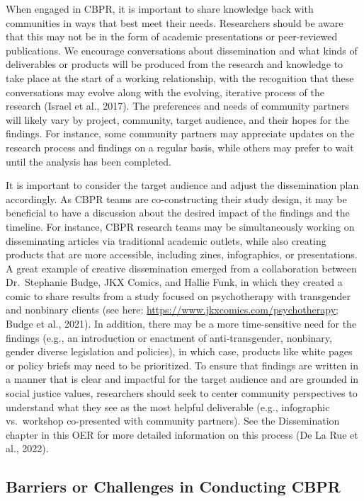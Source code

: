 \documentclass[
  11pt,
]{book}
\begin{document}
When engaged in CBPR, it is important to share knowledge back with communities in ways that best meet their needs. Researchers should be aware that this may not be in the form of academic presentations or peer-reviewed publications. We encourage conversations about dissemination and what kinds of deliverables or products will be produced from the research and knowledge to take place at the start of a working relationship, with the recognition that these conversations may evolve along with the evolving, iterative process of the research (Israel et al., 2017). The preferences and needs of community partners will likely vary by project, community, target audience, and their hopes for the findings. For instance, some community partners may appreciate updates on the research process and findings on a regular basis, while others may prefer to wait until the analysis has been completed.

It is important to consider the target audience and adjust the dissemination plan accordingly. As CBPR teams are co-constructing their study design, it may be beneficial to have a discussion about the desired impact of the findings and the timeline. For instance, CBPR research teams may be simultaneously working on disseminating articles via traditional academic outlets, while also creating products that are more accessible, including zines, infographics, or presentations. A great example of creative dissemination emerged from a collaboration between Dr.~Stephanie Budge, JKX Comics, and Hallie Funk, in which they created a comic to share results from a study focused on psychotherapy with transgender and nonbinary clients (see here: \url{https://www.jkxcomics.com/psychotherapy}; Budge et al., 2021). In addition, there may be a more time-sensitive need for the findings (e.g., an introduction or enactment of anti-transgender, nonbinary, gender diverse legislation and policies), in which case, products like white pages or policy briefs may need to be prioritized. To ensure that findings are written in a manner that is clear and impactful for the target audience and are grounded in social justice values, researchers should seek to center community perspectives to understand what they see as the most helpful deliverable (e.g., infographic vs.~workshop co-presented with community partners). See the Dissemination chapter in this OER for more detailed information on this process (De La Rue et al., 2022).

\hypertarget{barriers-or-challenges-in-conducting-cbpr}{%
\subsection{Barriers or Challenges in Conducting CBPR}\label{barriers-or-challenges-in-conducting-cbpr}}
\end{document}
